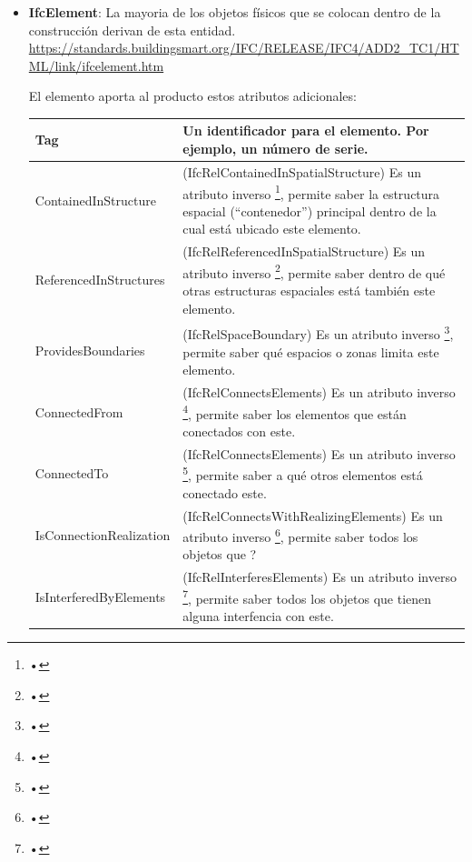 \documentclass[spanish,12pt,a4paper,final,oneside]{book}
\begin{document}
\begin{itemize}

\item \textbf{IfcElement}: La mayoria de los objetos físicos que se colocan dentro de la construcción derivan de esta entidad.
\\ \url{https://standards.buildingsmart.org/IFC/RELEASE/IFC4/ADD2_TC1/HTML/link/ifcelement.htm}

El elemento aporta al producto estos atributos adicionales:
\\ \begin{longtable}{|p{3.5cm} p{10cm}|}
\hline

Tag & Un identificador para el elemento. Por ejemplo, un número de serie.
\\[0.1cm] \hline

ContainedInStructure & (IfcRelContainedInSpatialStructure) Es un atributo inverso \footnote{•}, permite saber la estructura espacial (``contenedor'') principal dentro de la cual está ubicado este elemento.
\\[0.1cm] \hline

ReferencedInStructures & (IfcRelReferencedInSpatialStructure) Es un atributo inverso \footnote{•}, permite saber dentro de qué otras estructuras espaciales está también este elemento.
\\[0.1cm] \hline

ProvidesBoundaries & (IfcRelSpaceBoundary) Es un atributo inverso \footnote{•}, permite saber qué espacios o zonas limita este elemento.
\\[0.1cm] \hline

ConnectedFrom & (IfcRelConnectsElements) Es un atributo inverso \footnote{•}, permite saber los elementos que están conectados con este.
\\[0.1cm] \hline

ConnectedTo & (IfcRelConnectsElements) Es un atributo inverso \footnote{•}, permite saber a qué otros elementos está conectado este.
\\[0.1cm] \hline

IsConnectionRealization & (IfcRelConnectsWithRealizingElements) Es un atributo inverso \footnote{•}, permite saber  todos los objetos que ?
\\[0.1cm] \hline

IsInterferedByElements & (IfcRelInterferesElements) Es un atributo inverso \footnote{•}, permite saber todos los objetos que tienen alguna interfencia con este.
\\[0.1cm] \hline


\end{longtable}
\end{itemize}
\end{document}
